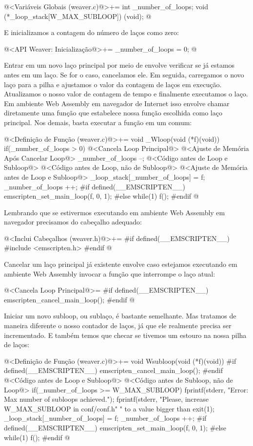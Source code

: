\iniciocodigo
@<Variáveis Globais (weaver.c)@>+=
int _number_of_loops;
void (*_loop_stack[W_MAX_SUBLOOP]) (void);
@
\fimcodigo


E inicializamos a contagem do número de laços como zero:

\iniciocodigo
@<API Weaver: Inicialização@>+=
_number_of_loops = 0;
@
\fimcodigo

Entrar em um novo laço principal por meio de 
envolve verificar se já estamos antes em um laço. Se for o caso,
cancelamos ele. Em seguida, carregamos o novo laço para a pilha e
ajustamos o valor da contagem de laços em execução. Atualizamos o
nosso valor de contagem de tempo e finalmente executamos o laço. Em
ambiente Web Assembly em navegador de Internet isso envolve chamar
diretamente uma função que estabelece nossa função escolhida como laço
principal. Nos demais, basta executar a função em
um  comum:

\iniciocodigo
@<Definição de Função (weaver.c)@>+=
void _Wloop(void (*f)(void)){
  if(_number_of_loops > 0){
    @<Cancela Loop Principal@>
    @<Ajuste de Memória Após Cancelar Loop@>
    _number_of_loops --;
  }
  @<Código antes de Loop e Subloop@>
  @<Código antes de Loop, não de Subloop@>
  @<Ajuste de Memória antes de Loop e Subloop@>
  _loop_stack[_number_of_loops] = f;
  _number_of_loops ++;
#if defined(__EMSCRIPTEN__)
  emscripten_set_main_loop(f, 0, 1);
#else
  while(1)
    f();
#endif
}
@
\fimcodigo

Lembrando que se estivermos executando em ambiente Web Assembly em
navegador precisamos do cabeçalho adequado:

\iniciocodigo
@<Inclui Cabeçalhos (weaver.h)@>+=
#if defined(__EMSCRIPTEN__)
#include <emscripten.h>
#endif
@
\fimcodigo

Cancelar um laço principal já existente envolve caso estejamos
executando em ambiente Web Assembly invocar a função que interrompe o
laço atual:

\iniciocodigo
@<Cancela Loop Principal@>=
#if defined(__EMSCRIPTEN__)
emscripten_cancel_main_loop();
#endif
@
\fimcodigo

Iniciar um novo subloop, ou sublaço, é bastante semelhante. Mas
tratamos de maneira diferente o nosso contador de laços, já que ele
realmente precisa ser incrementado. E também temos que checar se
tivemos um estouro na nossa pilha de laços:

\iniciocodigo
@<Definição de Função (weaver.c)@>+=
void Wsubloop(void (*f)(void)){
#if defined(__EMSCRIPTEN__)
    emscripten_cancel_main_loop();
#endif
  @<Código antes de Loop e Subloop@>
  @<Código antes de Subloop, não de Loop@>
  if(_number_of_loops >= W_MAX_SUBLOOP){
    fprintf(stderr, "Error: Max number of subloops achieved.\n");
    fprintf(stderr, "Please, increase W_MAX_SUBLOOP in conf/conf.h"
            " to a value bigger than %
    exit(1);
  }
  _loop_stack[_number_of_loops] = f;
  _number_of_loops ++;
#if defined(__EMSCRIPTEN__)
  emscripten_set_main_loop(f, 0, 1);
#else
  while(1)
    f();
#endif
}
@
\fimcodigo

